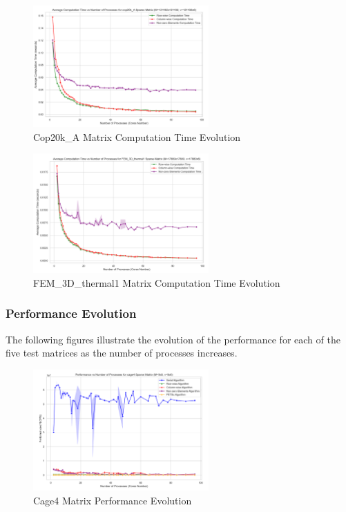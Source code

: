 \documentclass[12pt,oneside]{book} %
\begin{document}
\begin{figure}[H]
    \centering
    \includegraphics[width=0.6\textwidth]{../results/matrix_dim/cop20k_A_k6_computation_time.png}
    \caption{Cop20k\_A Matrix Computation Time Evolution}\label{fig:cop20k-a-k6-computation-tim-1}
\end{figure}

\begin{figure}[H]
    \centering
    \includegraphics[width=0.6\textwidth]{../results/matrix_dim/FEM_3D_thermal1_k6_computation_time.png}
    \caption{FEM\_3D\_thermal1 Matrix Computation Time Evolution}\label{fig:fem-3d-thermal1-k6-computation-time}
\end{figure}

\subsubsection{Performance Evolution}
The following figures illustrate the evolution of the performance for each of
the five test matrices as the number of processes increases.

\begin{figure}[H]
    \centering
    \includegraphics[width=0.6\textwidth]{../results/matrix_dim/cage4_k6_performance.png}
    \caption{Cage4 Matrix Performance Evolution}\label{fig:cage4-k6-performance}
\end{figure}
\end{document}
